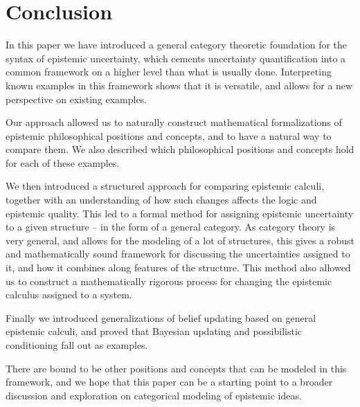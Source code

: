 \section{Conclusion}
In this paper we have introduced a general category theoretic foundation for the syntax of epistemic uncertainty, which cements uncertainty quantification into a common framework on a higher level than what is usually done. Interpreting known examples in this framework shows that it is versatile, and allows for a new perspective on existing examples. 

Our approach allowed us to naturally construct mathematical formalizations of epistemic philosophical positions and concepts, and to have a natural way to compare them. We also described which philosophical positions and concepts hold for each of these examples. 

We then introduced a structured approach for comparing epistemic calculi, together with an understanding of how such changes affects the logic and epistemic quality. This led to a formal method for assigning epistemic uncertainty to a given structure -- in the form of a general category. As category theory is very general, and allows for the modeling of a lot of structures, this gives a robust and mathematically sound framework for discussing the uncertainties assigned to it, and how it combines along features of the structure. This method also allowed us to construct a mathematically rigorous process for changing the epistemic calculus assigned to a system. 

Finally we introduced generalizations of belief updating based on general epistemic calculi, and proved that Bayesian updating and possibilistic conditioning fall out as examples. 

There are bound to be other positions and concepts that can be modeled in this framework, and we hope that this paper can be a starting point to a broader discussion and exploration on categorical modeling of epistemic ideas. 


